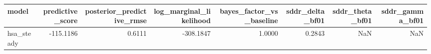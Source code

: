 \begin{tabular}{lrrrrrrr}
\toprule
model & predictive\_score & posterior\_predictive\_rmse & log\_marginal\_likelihood & bayes\_factor\_vs\_baseline & sddr\_delta\_bf01 & sddr\_theta\_bf01 & sddr\_gamma\_bf01 \\
\midrule
hsa\_steady & -115.1186 & 0.6111 & -308.1847 & 1.0000 & 0.2843 & NaN & NaN \\
\bottomrule
\end{tabular}
